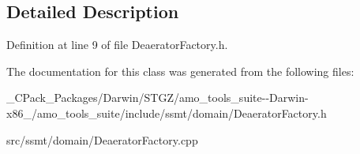 \subsection{Detailed Description}


Definition at line 9 of file Deaerator\+Factory.\+h.



The documentation for this class was generated from the following files\+:\begin{DoxyCompactItemize}
\item 
\+\_\+\+C\+Pack\+\_\+\+Packages/\+Darwin/\+S\+T\+G\+Z/amo\+\_\+tools\+\_\+suite-\/-\/\+Darwin-\/x86\+\_/amo\+\_\+tools\+\_\+suite/include/ssmt/domain/Deaerator\+Factory.\+h\item 
src/ssmt/domain/Deaerator\+Factory.\+cpp\end{DoxyCompactItemize}
